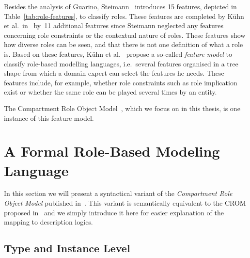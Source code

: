 Besides the analysis of Guarino, Steimann~\cite{Stei-DKE00} introduces 15 features, depicted in
Table~\ref{tab:role-features}, to classify roles. These features are completed by Kühn et al.\
in~\cite{KuLG-SLE14} by~11 additional features since Steimann neglected any features concerning
role constraints or the contextual nature of roles.  These features show how diverse roles can be
seen, and that there is not one definition of what a role is. Based on these features, Kühn et
al.~\cite{KuLG-SLE14} propose a so-called \emph{feature model} to classify role-based modelling
languages, i.e.\ several features organised in a tree shape from which a domain expert can select
the features he needs. These features include, for example, whether role constraints such as role
implication exist or whether the same role can be played several times by an entity.

The Compartment Role Object Model~\cite{KBG-SLE15}, which we focus on in this thesis, is one
instance of this feature model.

\section{A Formal Role-Based Modeling Language}
\label{sec:sigma-crom}

In this section we will present a syntactical variant of the \emph{Compartment Role Object Model}
published in~\cite{KBG-SLE15}. This variant is semantically equivalent to the CROM proposed in~\cite{KBG-SLE15} and we
simply introduce it here for easier explanation of the mapping to description logics.

\subsection{Type and Instance Level}
\label{sec:type-instance-level}

